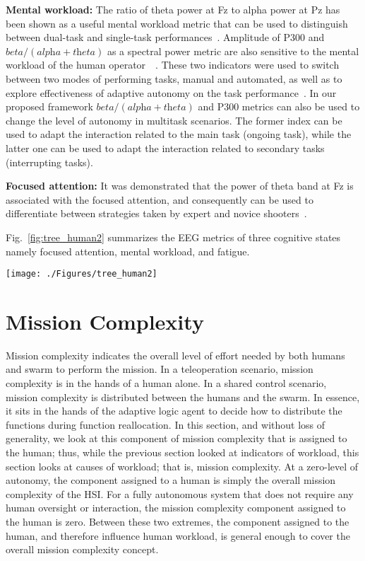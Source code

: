 \documentclass[journal]{IEEEtran}
\begin{document}
\textbf{Mental workload:} The ratio of theta power at Fz to alpha power at Pz has been shown as a useful mental workload metric that can be used to distinguish between dual-task and single-task performances~\cite{matthews2015psychometrics}. Amplitude of P300 and $\textit{beta}/(\textit{alpha}+\textit{theta})$ as a spectral power metric are also sensitive to the mental workload of the human operator~\cite{isreal1980p300}~\cite{prinzel2003effects}. These two indicators were used to switch between two modes of performing tasks, manual and automated, as well as to explore effectiveness of adaptive autonomy on the task performance~\cite{prinzel2003effects}. In our proposed framework  $\textit{beta}/(\textit{alpha}+\textit{theta})$ and P300 metrics can also be used to change the level of autonomy in multitask scenarios. The former index can be used to adapt the interaction related to the main task (ongoing task), while the latter one can be used to adapt the interaction related to secondary tasks (interrupting tasks).

\textbf{Focused attention:} It was demonstrated that the power of theta band at Fz is associated with the focused attention, and consequently can be used to differentiate between strategies taken by expert and novice shooters~\cite{doppelmayr2008frontal}. 

Fig.~\ref{fig:tree_human2} summarizes the EEG metrics of three cognitive states namely focused attention, mental workload, and fatigue.

\begin{figure*}[tp]
\centering
\texttt{[image: ./Figures/tree\_human2]}
\caption{The human cognitive states indicators.}
\label{fig:tree_human2}
\end{figure*}

\section{Mission Complexity}
\label{complexity}

Mission complexity indicates the overall level of effort needed by both humans and swarm to perform the mission. In a teleoperation scenario, mission complexity is in the hands of a human alone. In a shared control scenario, mission complexity is distributed between the humans and the swarm. In essence, it sits in the hands of the adaptive logic agent to decide how to distribute the functions during function reallocation. In this section, and without loss of generality, we look at this component of mission complexity that is assigned to the human; thus, while the previous section looked at indicators of workload, this section looks at causes of workload; that is, mission complexity. At a zero-level of autonomy, the component assigned to a human is simply the overall mission complexity of the HSI. For a fully autonomous system that does not require any human oversight or interaction, the mission complexity component assigned to the human is zero. Between these two extremes, the component assigned to the human, and therefore influence human workload, is general enough to cover the overall mission complexity concept.
\end{document}
